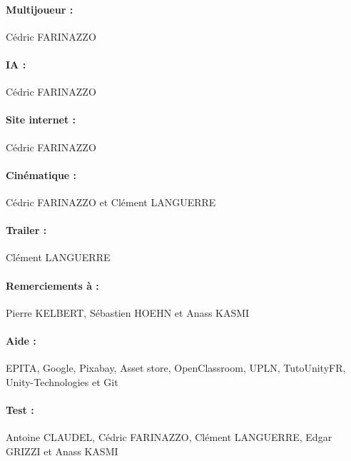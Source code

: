 \documentclass[titlepage, 11px, a4paper]{report}
\begin{document}
\paragraph*{Multijoueur : } \hspace{0pt}
Cédric FARINAZZO \\

\paragraph*{IA : } \hspace{0pt}
Cédric FARINAZZO \\

\paragraph*{Site internet : } \hspace{0pt}
Cédric FARINAZZO \\

\paragraph*{Cinématique : } \hspace{0pt}
Cédric FARINAZZO et 
Clément LANGUERRE \\

\paragraph*{Trailer : } \hspace{0pt}
Clément LANGUERRE \\

\paragraph*{Remerciements à : } \hspace{0pt}
Pierre KELBERT, 
Sébastien HOEHN et 
Anass KASMI \\

\paragraph*{Aide : } \hspace{0pt}
EPITA, 
Google, 
Pixabay, 
Asset store, 
OpenClassroom, 
UPLN, 
TutoUnityFR, 
Unity-Technologies et 
Git \\

\paragraph*{Test : } \hspace{0pt}
Antoine CLAUDEL, 
Cédric FARINAZZO, 
Clément LANGUERRE, 
Edgar GRIZZI et 
Anass KASMI \\
\end{document}
